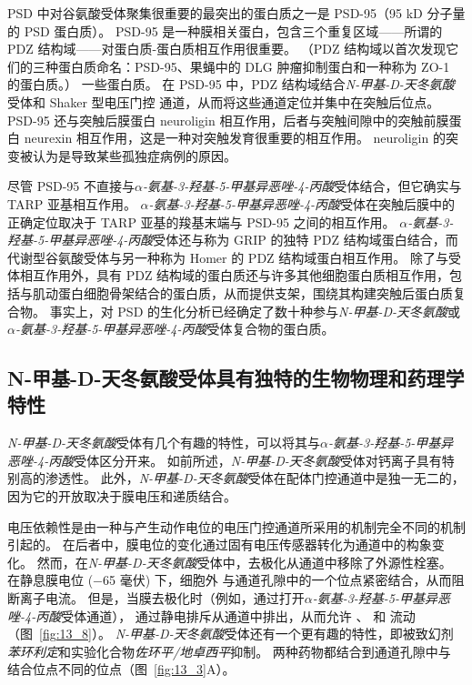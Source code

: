PSD 中对谷氨酸受体聚集很重要的最突出的蛋白质之一是 PSD-95（95 kD 分子量的 PSD 蛋白质）。
PSD-95 是一种膜相关蛋白，包含三个重复区域——所谓的 PDZ 结构域——对蛋白质-蛋白质相互作用很重要。 （PDZ 结构域以首次发现它们的三种蛋白质命名：PSD-95、果蝇中的 DLG 肿瘤抑制蛋白和一种称为 ZO-1 的蛋白质。） 一些蛋白质。
在 PSD-95 中，PDZ 结构域结合\textit{N-甲基-D-天冬氨酸}受体和 Shaker 型电压门控  通道，从而将这些通道定位并集中在突触后位点。
PSD-95 还与突触后膜蛋白 neuroligin 相互作用，后者与突触间隙中的突触前膜蛋白 neurexin 相互作用，这是一种对突触发育很重要的相互作用。 neuroligin 的突变被认为是导致某些孤独症病例的原因。


尽管 PSD-95 不直接与\textit{$\alpha$-氨基-3-羟基-5-甲基异恶唑-4-丙酸}受体结合，但它确实与 TARP 亚基相互作用。
\textit{$\alpha$-氨基-3-羟基-5-甲基异恶唑-4-丙酸}受体在突触后膜中的正确定位取决于 TARP 亚基的羧基末端与 PSD-95 之间的相互作用。
\textit{$\alpha$-氨基-3-羟基-5-甲基异恶唑-4-丙酸}受体还与称为 GRIP 的独特 PDZ 结构域蛋白结合，而代谢型谷氨酸受体与另一种称为 Homer 的 PDZ 结构域蛋白相互作用。
除了与受体相互作用外，具有 PDZ 结构域的蛋白质还与许多其他细胞蛋白质相互作用，包括与肌动蛋白细胞骨架结合的蛋白质，从而提供支架，围绕其构建突触后蛋白质复合物。
事实上，对 PSD 的生化分析已经确定了数十种参与\textit{N-甲基-D-天冬氨酸}或\textit{$\alpha$-氨基-3-羟基-5-甲基异恶唑-4-丙酸}受体复合物的蛋白质。



\subsection{N-甲基-D-天冬氨酸受体具有独特的生物物理和药理学特性}

\textit{N-甲基-D-天冬氨酸}受体有几个有趣的特性，可以将其与\textit{$\alpha$-氨基-3-羟基-5-甲基异恶唑-4-丙酸}受体区分开来。
如前所述，\textit{N-甲基-D-天冬氨酸}受体对钙离子具有特别高的渗透性。
此外，\textit{N-甲基-D-天冬氨酸}受体在配体门控通道中是独一无二的，因为它的开放取决于膜电压和递质结合。


电压依赖性是由一种与产生动作电位的电压门控通道所采用的机制完全不同的机制引起的。
在后者中，膜电位的变化通过固有电压传感器转化为通道中的构象变化。
然而，在\textit{N-甲基-D-天冬氨酸}受体中，去极化从通道中移除了外源性栓塞。
在静息膜电位 (−65 毫伏) 下，细胞外  与通道孔隙中的一个位点紧密结合，从而阻断离子电流。
但是，当膜去极化时（例如，通过打开\textit{$\alpha$-氨基-3-羟基-5-甲基异恶唑-4-丙酸}受体通道）， 通过静电排斥从通道中排出，从而允许 、 和  流动（图~\ref{fig:13_8}）。 
\textit{N-甲基-D-天冬氨酸}受体还有一个更有趣的特性，即被致幻剂\textit{苯环利定}和实验化合物\textit{佐环平/地卓西平}抑制。
两种药物都结合到通道孔隙中与  结合位点不同的位点（图~\ref{fig:13_3}A）。


